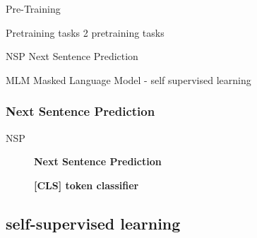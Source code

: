 \documentclass[10pt]{beamer}
\begin{document}
  \begin{frame}{Pre-Training}

    \begin{exampleblock}{Pretraining tasks}
      2 pretraining tasks
    \end{exampleblock}

      \begin{exampleblock}{NSP}
        Next Sentence Prediction
      \end{exampleblock}

      \begin{exampleblock}{MLM}
        Masked Language Model - self supervised learning
      \end{exampleblock}
  \end{frame}

  \subsubsection*{Next Sentence Prediction}
  \begin{frame}{NSP}
    \begin{figure}
      \centering
      \caption{\textbf{Next Sentence Prediction} }
    \end{figure}
    \begin{figure}
      \centering
      \caption{\textbf{[CLS] token classifier} }
    \end{figure}
  \end{frame}

  \subsection{self-supervised learning}
\end{document}
